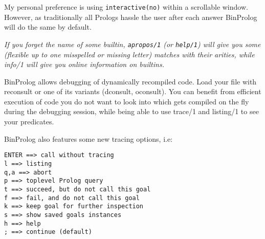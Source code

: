 \documentclass{article}
\begin{document}
{\flushleft My personal preference is using}
{\tt interactive(no)} within a scrollable window.
However, as traditionally all Prologs hassle the user after
each answer BinProlog  will do the same by default.

{\em If you forget the name of some builtin, {\tt apropos/1} (or {\tt help/1}) will
give you some (flexible up to one misspelled or missing
letter) matches with their arities, while info/1 will give you online
information on builtins.
}

BinProlog  allows debugging of dynamically recompiled code.
Load your file with reconsult or one of its variants (dconsult, oconsult).
You can benefit from efficient execution of code you do not want to
look into which gets compiled on the fly during the debugging session,
while being able to use trace/1 and listing/1 to see your predicates.

BinProlog  also features some new tracing options, i.e:

\begin{verbatim}
ENTER ==> call without tracing
l ==> listing
q,a ==> abort
p ==> toplevel Prolog query
t ==> succeed, but do not call this goal
f ==> fail, and do not call this goal
k ==> keep goal for further inspection
s ==> show saved goals instances
h ==> help
; ==> continue (default)
\end{verbatim}
\end{document}
